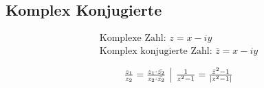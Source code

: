 \subsection{Komplex Konjugierte}
    \begin{align*}
        \text{Komplexe Zahl: } z = x - iy\\
        \text{Komplex konjugierte Zahl: } \bar{z} = x -iy\\
    \end{align*}
    \[\begin{array}{c | c}
        \frac{z_1}{z_2} = \frac{z_1 \cdot \bar{z_2}}{z_2 \cdot \bar{z_2}} & \frac{1}{z^2 - 1} = \frac{\bar{z}^2 -1}{|z^2 - 1|}
    \end{array}\]